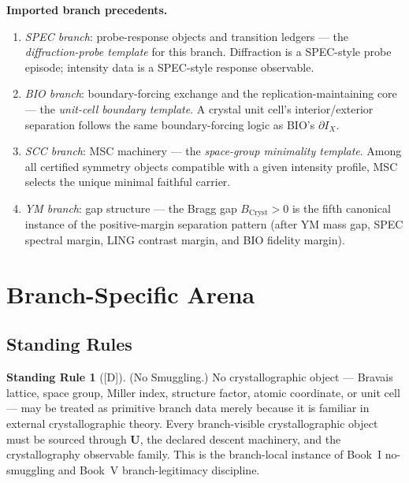 \documentclass[12pt,oneside]{amsbook}
\theoremstyle{plain}
\theoremstyle{definition}
\newtheorem{standingrule}[theorem]{Standing Rule}
\theoremstyle{remark}
\newcommand{\status}[1]{\textup{[#1]}}
\begin{document}
\textbf{Imported branch precedents.}
\begin{enumerate}[label=\textup{(\arabic*)}]
  \item \emph{SPEC branch}: probe-response objects and transition
    ledgers --- the \emph{diffraction-probe template} for this branch.
    Diffraction is a SPEC-style probe episode; intensity data is a
    SPEC-style response observable.
  \item \emph{BIO branch}: boundary-forcing exchange and the
    replication-maintaining core --- the \emph{unit-cell boundary
    template}.  A crystal unit cell's interior/exterior separation
    follows the same boundary-forcing logic as BIO's
    $\partial I_X$.
  \item \emph{SCC branch}: MSC machinery --- the
    \emph{space-group minimality template}.  Among all
    certified symmetry objects compatible with a given intensity
    profile, MSC selects the unique minimal faithful carrier.
  \item \emph{YM branch}: gap structure --- the Bragg gap
    $B_{\mathrm{Cryst}} > 0$ is the fifth canonical instance of
    the positive-margin separation pattern (after YM mass gap,
    SPEC spectral margin, LING contrast margin, and BIO fidelity
    margin).
\end{enumerate}

\section{Branch-Specific Arena}
\label{sec:cryst-arena}

\subsection{Standing Rules}

\begin{standingrule}[\status{D}]\label{sr:cryst-no-smuggling}
\textup{(No Smuggling.)}
No crystallographic object --- Bravais lattice, space group,
Miller index, structure factor, atomic coordinate, or unit cell ---
may be treated as primitive branch data merely because it is
familiar in external crystallographic theory.  Every branch-visible
crystallographic object must be sourced through $\mathbf{U}$,
the declared descent machinery, and the crystallography observable
family.  This is the branch-local instance of Book~I no-smuggling
and Book~V branch-legitimacy discipline.
\end{standingrule}
\end{document}
